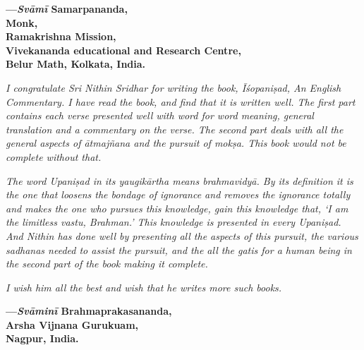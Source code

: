 \begin{flushright}
\textbf{---\emph{Svāmī} Samarpananda,}\\
\textbf{Monk,}\\
\textbf{Ramakrishna Mission,}\\
\textbf{Vivekananda educational and Research Centre,}\\
\textbf{Belur Math, Kolkata, India.}
\end{flushright}
\medskip

\emph{I congratulate Sri Nithin Sridhar for writing the book, Īśopaniṣad, An English Commentary. I have read the book, and find that it is written well. The first part contains each verse presented well with word for word meaning, general translation and a commentary on the verse. The second part deals with all the general aspects of ātmajñana and the pursuit of mokṣa. This book would not be complete without that.}

\emph{The word Upaniṣad in its yaugikārtha means brahmavidyā. By its definition it is the one that loosens the bondage of ignorance and removes the ignorance totally and makes the one who pursues this knowledge, gain this knowledge that, `I am the limitless vastu, Brahman.' This knowledge is presented in every Upaniṣad. And Nithin has done well by presenting all the aspects of this pursuit, the various sadhanas needed to assist the pursuit, and the all the gatis for a human being in the second part of the book making it complete.}

\emph{I wish him all the best and wish that he writes more such books.}
\medskip

\begin{flushright}
\textbf{---\emph{Svāminī} Brahmaprakasananda,}\\
\textbf{Arsha Vijnana Gurukuam,}\\
\textbf{Nagpur, India. }
\end{flushright}


